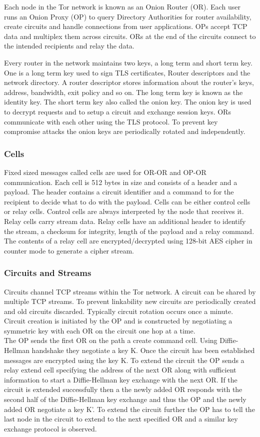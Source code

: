 \documentclass{llncs}
\begin{document}
Each node in the Tor network is known as an Onion Router (OR). Each user runs an Onion Proxy (OP) to query Directory Authorities for router availability, create circuits and handle connections from user applications. OPs accept TCP data and multiplex them across circuits. ORs at the end of the circuits connect to the intended recipients and relay the data.

Every router in the network maintains two keys, a long term and short term key. One is a long term key used to sign TLS certificates, Router descriptors and the network directory. A router descriptor stores information about the router's keys, address, bandwidth, exit policy and so on. The long term key is known as the identity key. The short term key also called the onion key. The onion key is used to decrypt requests and to setup a circuit and exchange session keys. ORs communicate with each other using the TLS protocol. To prevent key compromise attacks the onion keys are periodically rotated and independently.

\subsubsection{Cells}
Fixed sized messages called cells are used for OR-OR and OP-OR communication. Each cell is 512 bytes in size and consists of a header and a payload. The header contains a circuit identifier and a command to for the recipient to decide what to do with the payload.
Cells can be either control cells or relay cells. Control cells are always interpreted by the node that receives it. Relay cells carry stream data. Relay cells have an additional header to identify the stream, a checksum for integrity, length of the payload and a relay command. The contents of a relay cell are encrypted/decrypted using 128-bit AES cipher in counter mode to generate a cipher stream.

\subsubsection{Circuits and Streams}
Circuits channel TCP streams within the Tor network. A circuit can be shared by multiple TCP streams. To prevent linkability new circuits are periodically created and old circuits discarded. Typically circuit rotation occurs once a minute. Circuit creation is initiated by the OP and is constructed by negotiating a symmetric key with each OR on the circuit one hop at a time. \\ 
The OP sends the first OR on the path a create command cell. Using Diffie-Hellman handshake they negotiate a key K. Once the circuit has been established messages are encrypted using the key K. To extend the circuit the OP sends a relay extend cell specifying the address of the next OR along with sufficient information to start a Diffie-Hellman key exchange with the next OR. If the circuit is extended successfully then a the newly added OR responds with the second half of the Diffie-Hellman key exchange and thus the OP and the newly added OR negotiate a key K'. To extend the circuit further the OP has to tell the last node in the circuit to extend to the next specified OR and a similar key exchange protocol is observed.
\end{document}
